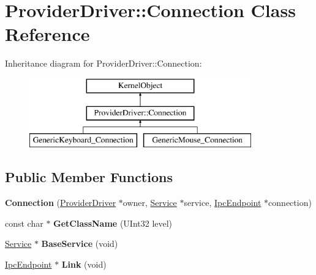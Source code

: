 \hypertarget{class_provider_driver_1_1_connection}{}\section{Provider\+Driver\+:\+:Connection Class Reference}
\label{class_provider_driver_1_1_connection}
Inheritance diagram for Provider\+Driver\+:\+:Connection\+:\begin{figure}[H]
\begin{center}
\leavevmode
\includegraphics[height=3.000000cm]{class_provider_driver_1_1_connection}
\end{center}
\end{figure}
\subsection*{Public Member Functions}
\begin{DoxyCompactItemize}
\item 
\mbox{\label{class_provider_driver_1_1_connection_aaf69c031c359e050378627914d1b1645}} 
{\bfseries Connection} (\hyperlink{class_provider_driver}{Provider\+Driver} $\ast$owner, \hyperlink{class_provider_driver_1_1_service}{Service} $\ast$service, \hyperlink{class_ipc_endpoint}{Ipc\+Endpoint} $\ast$connection)
\item 
\mbox{\label{class_provider_driver_1_1_connection_ab96165eb11d8db20fd451a4066c74a61}} 
const char $\ast$ {\bfseries Get\+Class\+Name} (U\+Int32 level)
\item 
\mbox{\label{class_provider_driver_1_1_connection_ab7f1baf6d5bc27b7c35c531f2d917cd9}} 
\hyperlink{class_provider_driver_1_1_service}{Service} $\ast$ {\bfseries Base\+Service} (void)
\item 
\mbox{\label{class_provider_driver_1_1_connection_a467446433448a38cea19a8387588610f}} 
\hyperlink{class_ipc_endpoint}{Ipc\+Endpoint} $\ast$ {\bfseries Link} (void)
\end{DoxyCompactItemize}

